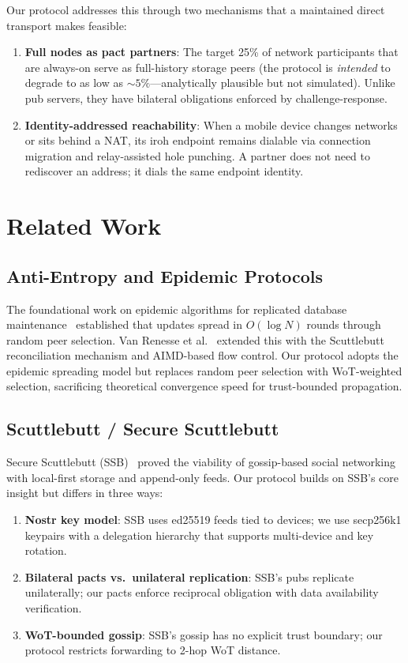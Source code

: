 \documentclass[11pt,a4paper]{article}
\begin{document}
Our protocol addresses this through two mechanisms that a maintained direct transport makes feasible:

\begin{enumerate}
  \item \textbf{Full nodes as pact partners}: The target 25\% of network participants that are always-on serve as full-history storage peers (the protocol is \emph{intended} to degrade to as low as ${\sim}5\%$---analytically plausible but not simulated). Unlike pub servers, they have bilateral obligations enforced by challenge-response.
  \item \textbf{Identity-addressed reachability}: When a mobile device changes networks or sits behind a NAT, its iroh endpoint remains dialable via connection migration and relay-assisted hole punching. A partner does not need to rediscover an address; it dials the same endpoint identity.
\end{enumerate}

\section{Related Work}

\subsection{Anti-Entropy and Epidemic Protocols}

The foundational work on epidemic algorithms for replicated database maintenance~\cite{demers} established that updates spread in $O(\log N)$ rounds through random peer selection. Van Renesse et al.~\cite{vanrenesse} extended this with the Scuttlebutt reconciliation mechanism and AIMD-based flow control. Our protocol adopts the epidemic spreading model but replaces random peer selection with WoT-weighted selection, sacrificing theoretical convergence speed for trust-bounded propagation.

\subsection{Scuttlebutt / Secure Scuttlebutt}

Secure Scuttlebutt (SSB)~\cite{ssb} proved the viability of gossip-based social networking with local-first storage and append-only feeds. Our protocol builds on SSB's core insight but differs in three ways:

\begin{enumerate}
  \item \textbf{Nostr key model}: SSB uses ed25519 feeds tied to devices; we use secp256k1 keypairs with a delegation hierarchy that supports multi-device and key rotation.
  \item \textbf{Bilateral pacts vs.\ unilateral replication}: SSB's pubs replicate unilaterally; our pacts enforce reciprocal obligation with data availability verification.
  \item \textbf{WoT-bounded gossip}: SSB's gossip has no explicit trust boundary; our protocol restricts forwarding to 2-hop WoT distance.
\end{enumerate}
\end{document}
